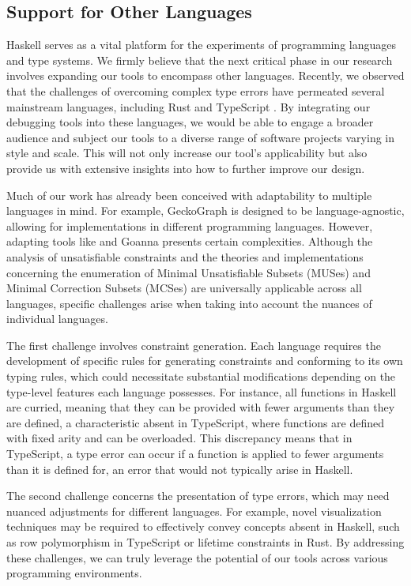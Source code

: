 \subsection{Support for Other Languages}
Haskell serves as a vital platform for the experiments of programming languages and type systems. We firmly believe that the next critical phase in our research involves expanding our tools to encompass other languages. Recently, we observed that the challenges of overcoming complex type errors have permeated several mainstream languages, including Rust \cite{Zeng2019-ou} and TypeScript \cite{Scarsbrook2023-uq}. By integrating our debugging tools into these languages, we would be able to engage a broader audience and subject our tools to a diverse range of software projects varying in style and scale. This will not only increase our tool's applicability but also provide us with extensive insights into how to further improve our design.

Much of our work has already been conceived with adaptability to multiple languages in mind. For example, GeckoGraph is designed to be language-agnostic, allowing for implementations in different programming languages. However, adapting tools like \chameleon{} and Goanna presents certain complexities. Although the analysis of unsatisfiable constraints and the theories and implementations concerning the enumeration of Minimal Unsatisfiable Subsets (MUSes) and Minimal Correction Subsets (MCSes) are universally applicable across all languages, specific challenges arise when taking into account the nuances of individual languages.

The first challenge involves constraint generation. Each language requires the development of specific rules for generating constraints and conforming to its own typing rules, which could necessitate substantial modifications depending on the type-level features each language possesses. For instance, all functions in Haskell are curried, meaning that they can be provided with fewer arguments than they are defined, a characteristic absent in TypeScript, where functions are defined with fixed arity and can be overloaded. This discrepancy means that in TypeScript, a type error can occur if a function is applied to fewer arguments than it is defined for, an error that would not typically arise in Haskell.

The second challenge concerns the presentation of type errors, which may need nuanced adjustments for different languages. For example, novel visualization techniques may be required to effectively convey concepts absent in Haskell, such as row polymorphism in TypeScript or lifetime constraints in Rust. By addressing these challenges, we can truly leverage the potential of our tools across various programming environments.

